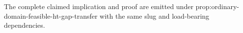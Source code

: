 The complete claimed implication and proof are emitted under prop:ordinary-domain-feasible-ht-gap-transfer with the same slug and load-bearing dependencies.